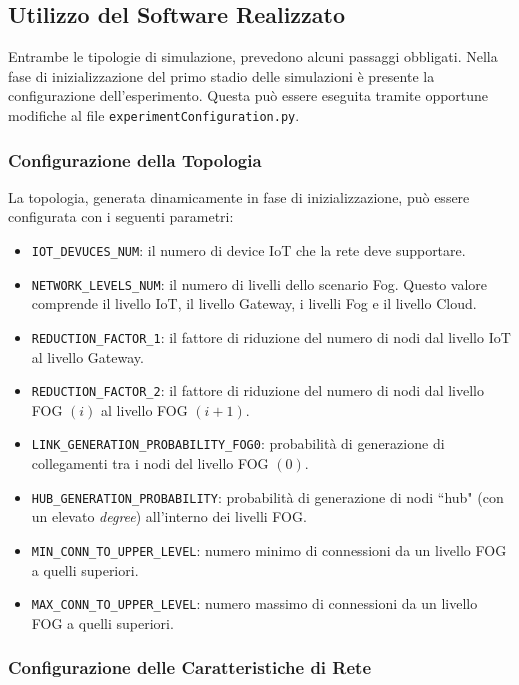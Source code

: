 \subsection{Utilizzo del Software Realizzato}

Entrambe le tipologie di simulazione, prevedono alcuni passaggi obbligati. Nella fase di inizializzazione del primo stadio delle simulazioni è presente la configurazione dell'esperimento. Questa può essere eseguita tramite opportune modifiche al file \texttt{experimentConfiguration.py}.

\subsubsection{Configurazione della Topologia}

La topologia, generata dinamicamente in fase di inizializzazione, può essere configurata con i seguenti parametri:
\begin{itemize}
	\item \texttt{IOT\_DEVUCES\_NUM}: il numero di device IoT che la rete deve supportare.
	\item \texttt{NETWORK\_LEVELS\_NUM}: il numero di livelli dello scenario Fog. Questo valore comprende il livello IoT, il livello Gateway, i livelli Fog e il livello Cloud.
	\item \texttt{REDUCTION\_FACTOR\_1}: il fattore di riduzione del numero di nodi dal livello IoT al livello Gateway.
	\item \texttt{REDUCTION\_FACTOR\_2}: il fattore di riduzione del numero di nodi dal livello FOG $(i)$ al livello FOG $(i+1)$.
	\item \texttt{LINK\_GENERATION\_PROBABILITY\_FOG0}: probabilità di generazione di collegamenti tra i nodi del livello FOG $(0)$.
	\item \texttt{HUB\_GENERATION\_PROBABILITY}: probabilità di generazione di nodi ``hub" (con un elevato \textit{degree}) all'interno dei livelli FOG. 
	\item \texttt{MIN\_CONN\_TO\_UPPER\_LEVEL}: numero minimo di connessioni da un livello FOG a quelli superiori.
	\item \texttt{MAX\_CONN\_TO\_UPPER\_LEVEL}: numero massimo di connessioni da un livello FOG a quelli superiori.
\end{itemize}

\subsubsection{Configurazione delle Caratteristiche di Rete}

